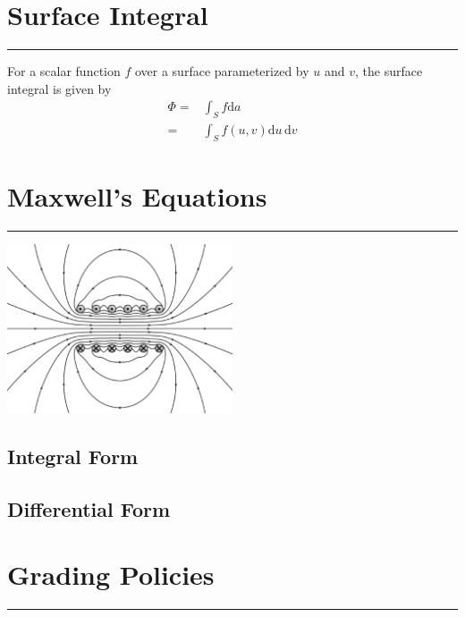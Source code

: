 \documentclass[letterpaper,10pt,titlepage]{article}
\begin{document}
\section*{Surface Integral}
\hrule

For a scalar function $f$ over a surface parameterized by $u$ and $v$, the surface integral is given by
\begin{align}
  \Phi =& \int_S f \mathrm{d}a\,\\
       =& \int_S f(u,v) \mathrm{d}u\, \mathrm{d}v
\end{align}

\newpage

\section*{Maxwell's Equations}
\hrule

\begin{center}
    \includegraphics[width=0.5\textwidth]{maxwell.eps}
\end{center}

\subsection*{Integral Form}

\subsection*{Differential Form}

\newpage

\section*{Grading Policies}
\hrule
\end{document}
